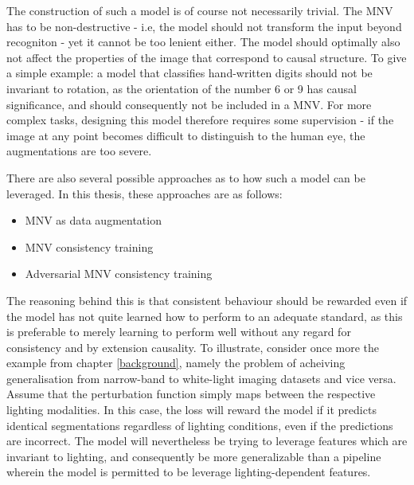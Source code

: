 		The construction of such a model is of course not necessarily trivial. The MNV has to be non-destructive - i.e, the model should not transform the input beyond recogniton - yet it cannot be too lenient either. The model should optimally also not affect the properties of the image that correspond to causal structure. To give a simple example: a model that classifies hand-written digits should not be invariant to rotation, as the orientation of the number 6 or 9 has causal significance, and should consequently not be included in a MNV. For more complex tasks, designing this model therefore requires some supervision - if the image at any point becomes difficult to distinguish to the human eye, the augmentations are too severe. 
	
		There are also several possible approaches as to how such a model can be leveraged. In this thesis, these approaches are as follows:
		\begin{itemize}
			\item MNV as data augmentation
			\item MNV consistency training
			\item Adversarial MNV consistency training
		\end{itemize}
	
		The reasoning behind this is that consistent behaviour should be rewarded even if the model has not quite learned how to perform to an adequate standard, as this is preferable to merely learning to perform well without any regard for consistency and by extension causality.  To illustrate, consider once more the example from chapter \ref{background}, namely the problem of acheiving generalisation from narrow-band to white-light imaging datasets and vice versa. Assume that the perturbation function simply maps between the respective lighting modalities. In this case, the loss will reward the model if it predicts identical segmentations regardless of lighting conditions, even if the predictions are incorrect. The model will nevertheless be trying to leverage features which are invariant to lighting, and consequently be more generalizable than a pipeline wherein the model is permitted to be leverage lighting-dependent features.